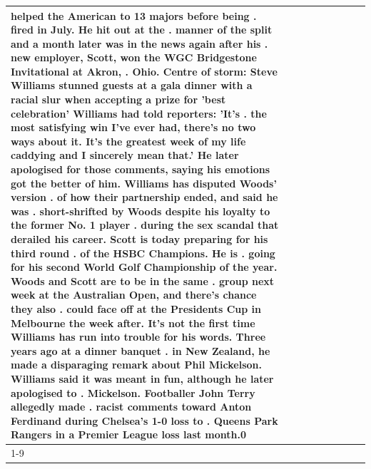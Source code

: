 \begin{table}[H]
\begin{tabular}{lllrlllll}
helped the American to 13 majors before being . fired in July. He hit out at the . manner of the split and a month later was in the news again after his . new employer, Scott, won the WGC Bridgestone Invitational at Akron, . Ohio. Centre of storm: Steve Williams stunned guests at a gala dinner with a racial slur when accepting a prize for 'best celebration' Williams had told reporters: 'It's . the most satisfying win I've ever had, there's no two ways about it. It's the greatest week of my life caddying and I sincerely mean that.' He later apologised for those comments, saying his emotions got the better of him. Williams has disputed Woods' version . of how their partnership ended, and said he was . short-shrifted by Woods despite his loyalty to the former No. 1 player . during the sex scandal that derailed his career. Scott is today preparing for his third round . of the HSBC Champions. He is . going for his second World Golf Championship of the year. Woods and Scott are to be in the same . group next week at the Australian Open, and there's chance they also . could face off at the Presidents Cup in Melbourne the week after. It's not the first time Williams has run into trouble for his words. Three years ago at a dinner banquet . in New Zealand, he made a disparaging remark about Phil Mickelson. Williams said it was meant in fun, although he later apologised to . Mickelson. Footballer John Terry allegedly made . racist comments toward Anton Ferdinand during Chelsea's 1-0 loss to . Queens Park Rangers in a Premier League loss last month.0 \\
\cline{1-9}

\end{tabular}
\end{table}
